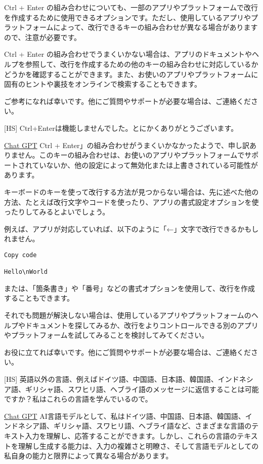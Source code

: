 \documentclass[
]{book}
\theoremstyle{definition}
\theoremstyle{definition}
\theoremstyle{definition}
\theoremstyle{definition}
\theoremstyle{remark}
\begin{document}
Ctrl + Enter の組み合わせについても、一部のアプリやプラットフォームで改行を作成するために使用できるオプションです。ただし、使用しているアプリやプラットフォームによって、改行できるキーの組み合わせが異なる場合がありますので、注意が必要です。

Ctrl + Enter の組み合わせでうまくいかない場合は、アプリのドキュメントやヘルプを参照して、改行を作成するための他のキーの組み合わせに対応しているかどうかを確認することができます。また、お使いのアプリやプラットフォームに固有のヒントや裏技をオンラインで検索することもできます。

ご参考になれば幸いです。他にご質問やサポートが必要な場合は、ご連絡ください。

{[}HS{]} Ctrl+Enterは機能しませんでした。とにかくありがとうございます。

\protect\hyperlink{chatgpt}{Chat GPT} Ctrl + Enter」の組み合わせがうまくいかなかったようで、申し訳ありません。このキーの組み合わせは、お使いのアプリやプラットフォームでサポートされていないか、他の設定によって無効化または上書きされている可能性があります。

キーボードのキーを使って改行する方法が見つからない場合は、先に述べた他の方法、たとえば改行文字やコードを使ったり、アプリの書式設定オプションを使ったりしてみるとよいでしょう。

例えば、アプリが対応していれば、以下のように「←」文字で改行できるかもしれません。

\begin{verbatim}
Copy code

Hello\nWorld
\end{verbatim}

または、「箇条書き」や「番号」などの書式オプションを使用して、改行を作成することもできます。

それでも問題が解決しない場合は、使用しているアプリやプラットフォームのヘルプやドキュメントを探してみるか、改行をよりコントロールできる別のアプリやプラットフォームを試してみることを検討してみてください。

お役に立てれば幸いです。他にご質問やサポートが必要な場合は、ご連絡ください。

{[}HS{]} 英語以外の言語、例えばドイツ語、中国語、日本語、韓国語、インドネシア語、ギリシャ語、スワヒリ語、ヘブライ語のメッセージに返信することは可能ですか？私はこれらの言語を学んでいるので。

\protect\hyperlink{chatgpt}{Chat GPT} AI言語モデルとして、私はドイツ語、中国語、日本語、韓国語、インドネシア語、ギリシャ語、スワヒリ語、ヘブライ語など、さまざまな言語のテキスト入力を理解し、応答することができます。しかし、これらの言語のテキストを理解し生成する能力は、入力の複雑さと明瞭さ、そして言語モデルとしての私自身の能力と限界によって異なる場合があります。
\end{document}
